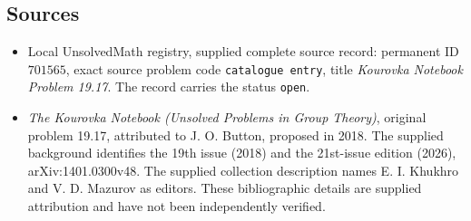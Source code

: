 \documentclass[11pt]{article}
\begin{document}
\subsection{Sources}
\begin{itemize}
\item Local UnsolvedMath registry, supplied complete source record: permanent ID \(701565\), exact source problem code \texttt{catalogue entry}, title \emph{Kourovka Notebook Problem 19.17}. The record carries the status \texttt{open}.
\item \emph{The Kourovka Notebook (Unsolved Problems in Group Theory)}, original problem 19.17, attributed to J. O. Button, proposed in 2018. The supplied background identifies the 19th issue (2018) and the 21st-issue edition (2026), arXiv:1401.0300v48. The supplied collection description names E. I. Khukhro and V. D. Mazurov as editors. These bibliographic details are supplied attribution and have not been independently verified.
\end{itemize}
\end{document}
